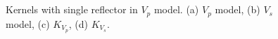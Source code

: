 \begin{figure}[h]
   \centering
   \\
   \\
   \caption{Kernels with single reflector in $V_p$ model. (a) $V_p$ model, (b) $V_s$ model, (c) $K_{V_p}$, (d) $K_{V_s}$.}
   \label{fig:kernel1_vp}
\end{figure}

